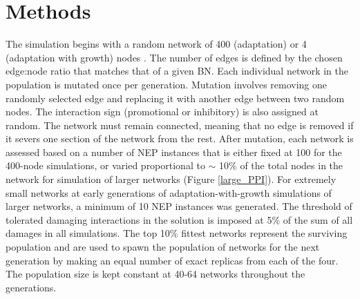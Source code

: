 \section{Methods}
The simulation begins with a random network of 400  (adaptation) or 4 (adaptation with growth) nodes . The number of edges is defined by the
 chosen edge:node ratio that matches that of a given BN. Each individual network in the population is mutated once per generation. Mutation involves 
 removing one randomly selected edge and replacing it with another edge between two random nodes.
 The interaction sign (promotional or inhibitory) is also assigned at random. 
 The network must remain connected, meaning that no edge is removed if it severs one section of the network from the rest. 
 After mutation, each network is assessed based on a number of NEP instances that is either fixed at 100 for the 400-node simulations, or varied proportional to ${\sim}$
 10\% of the total nodes in the network for simulation of larger networks (Figure \ref{large_PPI}). 
 For extremely small networks at early generations of adaptation-with-growth simulations of larger networks, a minimum 
 of 10 NEP instances was generated. 
 The threshold  of tolerated damaging interactions 
 in the solution 
 is imposed at 5\% of the sum of all damages in all simulations. The top 10\% fittest networks represent the surviving population and 
 are used to spawn the population of networks for the next generation by making an equal number of exact replicas from each of the four. 
 The population size is kept constant at 40-64 networks throughout the generations. 
 
